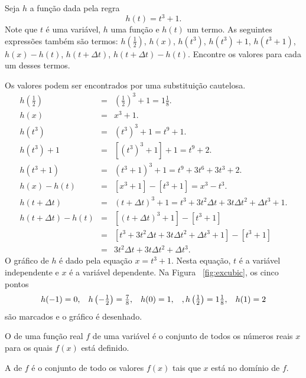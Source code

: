 \begin{example}\label{ex:distinctfunc}
Seja $h$ a função dada pela regra
\[
  h(t) = t^3 + 1.
\]
Note que $t$ é uma variável, $h$ uma função e $h(t)$ um termo.
As seguintes expressões também são termos: $h\left(\frac{1}{2}\right)$,
$h(x)$, $h(t^3)$, $h(t^3) + 1$, $h(t^3+1)$, $h(x) - h(t)$, $h(t + \Delta t)$,
$h(t+\Delta t) - h(t)$. Encontre os valores para cada um desses termos.

Os valores podem ser encontrados por uma substituição cautelosa.
\begin{eqnarray*}
  h\left(\frac{1}{2}\right) & = & \left(\frac{1}{2}\right)^3 + 1 = 1 \frac{1}{8}. \\
  h(x) & = & x^3 + 1. \\
  h(t^3) & = & \left(t^3\right)^3 + 1 = t^9 + 1. \\
  h(t^3) + 1 & = & \left[ \left( t^3 \right)^3 + 1 \right] + 1 = t^9 + 2. \\
  h(t^3 +  1) & = & \left( t^3 + 1 \right)^3 + 1 = t^9 + 3t^6 + 3t^3 + 2. \\
  h(x) - h(t) & = & \left[ x^3 + 1 \right] - \left[ t^3 + 1 \right] =
                    x^3 - t^3. \\
  h(t + \Delta t) & = & (t + \Delta t)^3 + 1 = t^3 + 3t^2 \Delta t +
                        3t \Delta t^2 + \Delta t^3 + 1. \\
  h(t + \Delta t) - h(t) & = &
                \left[ (t + \Delta t)^3 + 1 \right] -
                \left[ t^3 + 1 \right] \\
                         & = &
                \left[ t^3 + 3t^2 \Delta t +
                       3t \Delta t^2 + \Delta t^3 + 1 \right] -
                \left[ t^3 + 1 \right] \\
                         & = & 3t^2 \Delta t + 3t \Delta t^2 + \Delta t^3.
\end{eqnarray*}
O gráfico de $h$ é dado pela equação $x = t^3 + 1$. Nesta equação,
$t$ é a variável independente e $x$ é a variável dependente. Na Figura~%
\ref{fig:excubic}, os cinco pontos
\[
\textstyle
  h(-1) = 0, \hspace{2ex} h\left(-\frac{1}{2}\right) = \frac{7}{8}, \hspace{2ex}
  h(0) = 1, \hspace{2ex}, h\left(\frac{1}{2}\right) = 1 \frac{1}{8}, \hspace{2ex}
  h(1) = 2
\]
são marcados e o gráfico é desenhado.
\end{example}


\begin{defin}
O  de uma função real $f$ de uma variável é o conjunto
de todos os números reais $x$ para os quais $f(x)$ está definido.

A  de $f$ é o conjunto de todo os valores $f(x)$
tais que $x$ está no domínio de $f$.
\end{defin}

